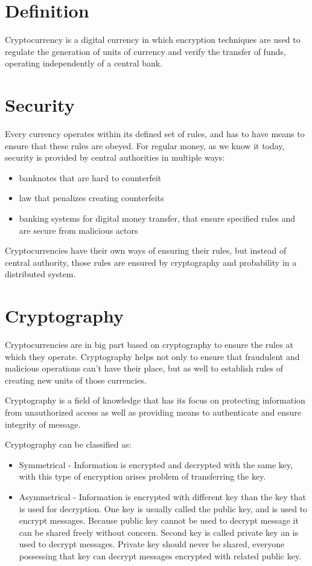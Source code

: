 \documentclass[12pt, en, eng, oneside, final]{mgr}
\begin{document}
\section{Definition}
Cryptocurrency is a digital currency in which encryption techniques are used to regulate the generation of units of currency and verify the transfer of funds, operating independently of a central bank. \cite{crypto-def}

\section{Security}
Every currency operates within its defined set of rules, and has to have means to ensure that these rules are obeyed. For regular money, as we know it today, security is provided by central authorities in multiple ways:
\begin{itemize}
\item
banknotes that are hard to counterfeit
\item
law that penalizes creating counterfeits
\item
banking systems for digital money transfer, that ensure specified rules and are secure from malicious actors
\end{itemize}

Cryptocurrencies have their own ways of ensuring their rules, but instead of central authority, those rules are ensured by cryptography and probability in a distributed system.

\section{Cryptography}
Cryptocurrencies are in big part based on cryptography to ensure the rules at which they operate. Cryptography helps not only to ensure that fraudulent and malicious operations can't have their place, but as well to establish rules of creating new units of those currencies. 

Cryptography is a field of knowledge that has its focus on protecting information from unauthorized access as well as providing means to authenticate and ensure integrity of message.

Cryptography can be classified as:

\begin{itemize}
\item
Symmetrical - Information is encrypted and decrypted with the same key, with this type of encryption arises problem of transferring the key.
\item
Asymmetrical - Information is encrypted with different key than the key that is used for decryption. One key is usually called the public key, and is used to encrypt messages. Because public key cannot be used to decrypt message it can be shared freely without concern. Second key is called private key an is used to decrypt messages. Private key should never be shared, everyone possessing that key can decrypt messages encrypted with related public key.
\end{itemize} 
\end{document}
